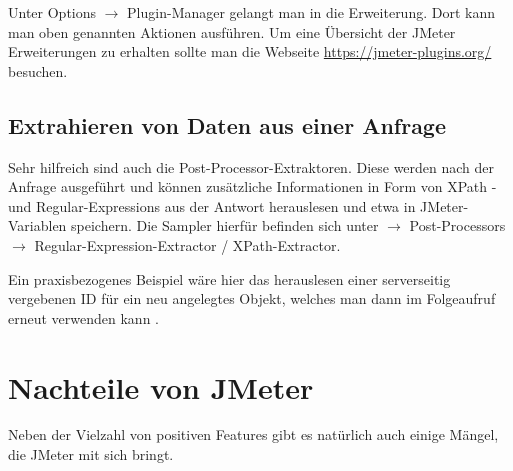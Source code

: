 \documentclass[a4paper,12pt]{article}
\begin{document}
Unter Options $\rightarrow$ Plugin-Manager gelangt man in die Erweiterung. Dort kann man oben genannten Aktionen ausführen. Um eine Übersicht der JMeter Erweiterungen zu erhalten sollte man die Webseite \url{https://jmeter-plugins.org/} besuchen.

\subsection{Extrahieren von Daten aus einer Anfrage}
Sehr hilfreich sind auch die Post-Processor-Extraktoren. Diese werden nach der Anfrage ausgeführt und können zusätzliche Informationen in Form von XPath -und Regular-Expressions aus der Antwort herauslesen und etwa in JMeter-Variablen speichern. Die Sampler hierfür befinden sich unter $\rightarrow$ Post-Processors $\rightarrow$ Regular-Expression-Extractor / XPath-Extractor.

Ein praxisbezogenes Beispiel wäre hier das herauslesen einer serverseitig vergebenen ID für ein neu angelegtes Objekt, welches man dann im Folgeaufruf erneut verwenden kann \cite{online:lasttestjmeter}.   

\section{Nachteile von JMeter}
Neben der Vielzahl von positiven Features gibt es natürlich auch einige Mängel, die JMeter mit sich bringt.
\end{document}
